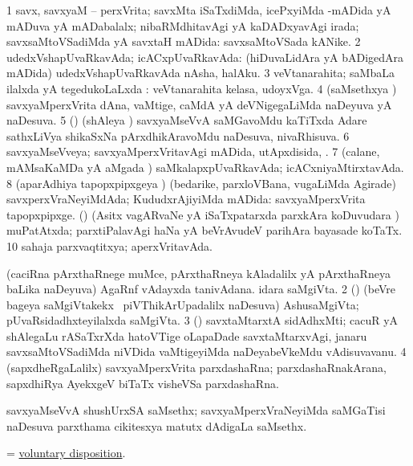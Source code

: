 \bentry 
{} 
\gl{\gu}
\expl{}
\bmng
\bnum
\num{1} savx, savxyaM -- perxVrita; savxMta iSaTxdiMda, icePxyiMda -mADida yA mADuva yA mADabalalx; nibaRMdhitavAgi yA kaDADxyavAgi irada; savxsaMtoVSadiMda yA savxtaH mADida:  savxsaMtoVSada kANike. 
\num{2} udedxVshapUvaRkavAda; icACxpUvaRkavAda:  (hiDuvaLidAra yA bADigedAra mADida) udedxVshapUvaRkavAda nAsha, halAku. 
\num{3} veVtanarahita; saMbaLa ilalxda yA tegedukoLaLxda :  veVtanarahita kelasa, udoyxVga. 
\num{4} (saMsethxya \vi) savxyaMperxVrita dAna, vaMtige, caMdA yA deVNigegaLiMda naDeyuva yA naDesuva. 
\num{5} (\birx) (shAleya \vi) savxyaMseVvA saMGavoMdu kaTiTxda Adare sathxLiVya shikaSxNa pArxdhikAravoMdu naDesuva, nivaRhisuva. 
\num{6} savxyaMseVveya; savxyaMperxVritavAgi mADida, utApxdisida, \mo. 
\num{7} (calane, mAMsaKaMDa yA aMgada \vi) saMkalapxpUvaRkavAda; icACxniyaMtirxtavAda. 
\num{8} (aparAdhiya tapopxpipxgeya \vi) (bedarike, parxloVBana, \mo vugaLiMda Agirade) savxperxVraNeyiMdAda; KududxrAjiyiMda mADida:  savxyaMperxVrita tapopxpipxge. (\nAyxshA) (Asitx vagARvaNe yA iSaTxpatarxda parxkAra koDuvudara \vi) muPatAtxda; parxtiPalavAgi haNa yA beVrAvudeV parihAra bayasade koTaTx. 
\num{10} sahaja parxvaqtitxya; aperxVritavAda. 
\enum
\emng
\eentry

\bentry 
{} 
\gl{\nA}
\bmng
\bnum
{} 
\banum
{} (caciRna pArxthaRnege muMce, pArxthaRneya kAladalilx yA pArxthaRneya baLika naDeyuva) AgaRnf vAdayxda tanivAdana. 
 idara saMgiVta. 
\eanum
\numie
\num{2} (\pArxparx) (beVre bageya saMgiVtakekx \kanmu\ piVThikArUpadalilx naDesuva) AshusaMgiVta; pUvaRsidadhxteyilalxda saMgiVta. 
\num{3} (\ca) savxtaMtarxtA sidAdhxMti; cacuR yA shAlegaLu rASaTxrXda hatoVTige oLapaDade savxtaMtarxvAgi, janaru savxsaMtoVSadiMda niVDida vaMtigeyiMda naDeyabeVkeMdu vAdisuvavanu. 
\num{4} (sapxdheRgaLalilx) savxyaMperxVrita parxdashaRna; parxdashaRnakArana, sapxdhiRya AyekxgeV biTaTx visheVSa parxdashaRna. 
\enum
\emng
\eentry
 
\bentry
{}
\gl{\nA}
\expl{}
\bmng
 savxyaMseVvA shushUrxSA saMsethx; savxyaMperxVraNeyiMda saMGaTisi naDesuva parxthama cikitesxya matutx dAdigaLa saMsethx. 
\emng
\eentry

\bentry 
{}
\gl{\nA}
\expl{}
\bmng
 = \hyperlink{voluntary disposition}{voluntary disposition}. 
\emng
\eentry


